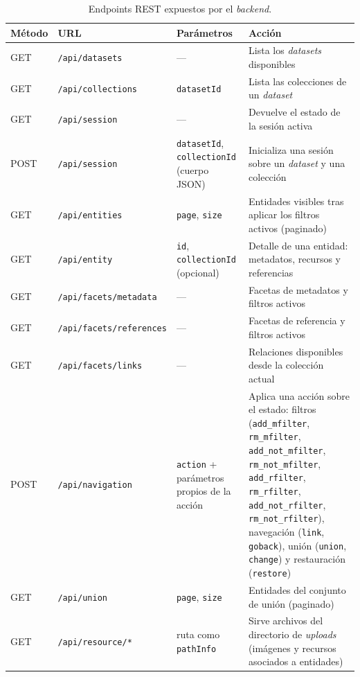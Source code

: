 \begin{table}[H]
  \centering
  \footnotesize
  \renewcommand{\arraystretch}{1.2}
  \setlength{\tabcolsep}{4pt}
  \begin{tabular}{|l|p{4.1cm}|p{2.8cm}|p{4.7cm}|}
    \hline
    \textbf{Método} & \textbf{URL} & \textbf{Parámetros} & \textbf{Acción} \\
    \hline
    GET  & \texttt{/api/datasets}    & ---                       & Lista los \textit{datasets} disponibles \\
    \hline
    GET  & \texttt{/api/collections} & \texttt{datasetId}        & Lista las colecciones de un \textit{dataset} \\
    \hline
    GET  & \texttt{/api/session}     & ---                       & Devuelve el estado de la sesión activa \\
    \hline
    POST & \texttt{/api/session}     & \texttt{datasetId}, \texttt{collectionId} (cuerpo JSON) & Inicializa una sesión sobre un \textit{dataset} y una colección \\
    \hline
    GET  & \texttt{/api/entities}    & \texttt{page}, \texttt{size} & Entidades visibles tras aplicar los filtros activos (paginado) \\
    \hline
    GET  & \texttt{/api/entity}      & \texttt{id}, \texttt{collectionId} (opcional) & Detalle de una entidad: metadatos, recursos y referencias \\
    \hline
    GET  & \texttt{/api/facets/metadata}   & ---                 & Facetas de metadatos y filtros activos \\
    \hline
    GET  & \texttt{/api/facets/references} & ---                 & Facetas de referencia y filtros activos \\
    \hline
    GET  & \texttt{/api/facets/links}      & ---                 & Relaciones disponibles desde la colección actual \\
    \hline
    POST & \texttt{/api/navigation}  & \texttt{action} + parámetros propios de la acción & Aplica una acción sobre el estado: filtros (\texttt{add\_mfilter}, \texttt{rm\_mfilter}, \texttt{add\_not\_mfilter}, \texttt{rm\_not\_mfilter}, \texttt{add\_rfilter}, \texttt{rm\_rfilter}, \texttt{add\_not\_rfilter}, \texttt{rm\_not\_rfilter}), navegación (\texttt{link}, \texttt{goback}), unión (\texttt{union}, \texttt{change}) y restauración (\texttt{restore}) \\
    \hline
    GET  & \texttt{/api/union}       & \texttt{page}, \texttt{size} & Entidades del conjunto de unión (paginado) \\
    \hline
    GET  & \texttt{/api/resource/*}  & ruta como \texttt{pathInfo} & Sirve archivos del directorio de \textit{uploads} (imágenes y recursos asociados a entidades) \\
    \hline
  \end{tabular}
  \caption{Endpoints REST expuestos por el \textit{backend}.}
  \label{tab:endpoints}
\end{table}

